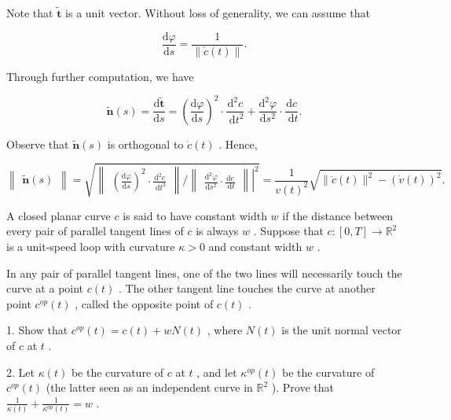 \documentclass[10pt]{article}
\begin{document}
Note that \(\widetilde{\mathbf{t}}\) is a unit vector. Without loss of generality, we can assume that

\[
\frac{\mathrm{d}\varphi }{\mathrm{d}s} = \frac{1}{\parallel \dot{c}\left( t\right) \parallel }.
\]

Through further computation, we have

\[
\widetilde{\mathbf{n}}\left( s\right)  = \frac{\mathrm{d}\widetilde{\mathbf{t}}}{\mathrm{d}s} = {\left( \frac{\mathrm{d}\varphi }{\mathrm{d}s}\right) }^{2} \cdot  \frac{{\mathrm{d}}^{2}c}{\mathrm{\;d}{t}^{2}} + \frac{{\mathrm{d}}^{2}\varphi }{\mathrm{d}{s}^{2}} \cdot  \frac{\mathrm{d}c}{\mathrm{\;d}t}.
\]

Observe that \(\widetilde{\mathbf{n}}\left( s\right)\) is orthogonal to \(\dot{c}\left( t\right)\) . Hence,

\[
\begin{Vmatrix}{\widetilde{\mathbf{n}}\left( s\right) }\end{Vmatrix} = \sqrt{\begin{Vmatrix}{{\left( \frac{\mathrm{d}\varphi }{\mathrm{d}s}\right) }^{2} \cdot  \frac{{\mathrm{d}}^{2}c}{\mathrm{\;d}{t}^{2}}}\end{Vmatrix}/{\left. \begin{Vmatrix}\frac{{\mathrm{d}}^{2}\varphi }{\mathrm{d}{s}^{2}} \cdot  \frac{\mathrm{d}c}{\mathrm{\;d}t}\end{Vmatrix}\right| }^{2}} = \frac{1}{v{\left( t\right) }^{2}}\sqrt{\parallel \ddot{c}\left( t\right) {\parallel }^{2} - {\left( \dot{v}\left( t\right) \right) }^{2}}.
\]

\begin{problem}[title=PROBLEM 3 (7 POINTS)]
A closed planar curve \(c\) is said to have constant width \(w\) if the distance between every pair of parallel tangent lines of \(c\) is always \(w\) . Suppose that \(c : \left\lbrack  {0,T}\right\rbrack   \rightarrow  {\mathbb{R}}^{2}\) is a unit-speed loop with curvature \(\kappa  > 0\) and constant width \(w\) .

In any pair of parallel tangent lines, one of the two lines will necessarily touch the curve at a point \(c\left( t\right)\) . The other tangent line touches the curve at another point \({c}^{op}\left( t\right)\) , called the opposite point of \(c\left( t\right)\) .

1. Show that \({c}^{op}\left( t\right)  = c\left( t\right)  + {wN}\left( t\right)\) , where \(N\left( t\right)\) is the unit normal vector of \(c\) at \(t\) .

2. Let \(\kappa \left( t\right)\) be the curvature of \(c\) at \(t\) , and let \({\kappa }^{op}\left( t\right)\) be the curvature of \({c}^{op}\left( t\right)\) (the latter seen as an independent curve in \({\mathbb{R}}^{2}\) ). Prove that \(\frac{1}{\kappa \left( t\right) } + \frac{1}{{\kappa }^{op}\left( t\right) } = w\) .
\end{problem}
\end{document}
